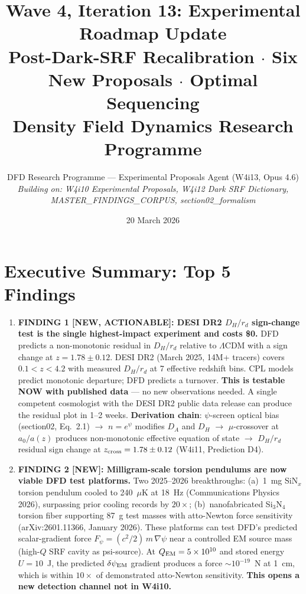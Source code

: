 \documentclass[11pt]{article}
\title{Wave 4, Iteration 13: Experimental Roadmap Update\\
\large Post-Dark-SRF Recalibration $\cdot$ Six New Proposals $\cdot$ Optimal Sequencing\\[6pt]
\normalsize Density Field Dynamics Research Programme}
\author{DFD Research Programme --- Experimental Proposals Agent (W4i13, Opus 4.6)\\
\textit{Building on: W4i10 Experimental Proposals, W4i12 Dark SRF Dictionary,\\
MASTER\_FINDINGS\_CORPUS, section02\_formalism}}
\date{20 March 2026}
\newcommand{\ee}[1]{\times 10^{#1}}
\newcommand{\dpsi}{\delta\psi}
\newcommand{\LCDM}{\Lambda\text{CDM}}
\begin{document}
\maketitle

\section*{Executive Summary: Top 5 Findings}

\begin{tcolorbox}[colback=blue!5!white, colframe=blue!60!black,
  title=\textbf{W4i13 TOP 5 FINDINGS --- Ranked by Programme Impact}]
\begin{enumerate}

\item \textbf{FINDING 1 [NEW, ACTIONABLE]: DESI DR2 $D_H/r_d$ sign-change test
is the single highest-impact experiment and costs \$0.} DFD predicts a
non-monotonic residual in $D_H/r_d$ relative to $\LCDM$ with a sign
change at $z = 1.78 \pm 0.12$. DESI DR2 (March 2025, 14M+ tracers) covers
$0.1 < z < 4.2$ with measured $D_H/r_d$ at 7 effective redshift bins.
CPL models predict monotonic departure; DFD predicts a turnover.
\textbf{This is testable NOW with published data} --- no new observations
needed. A single competent cosmologist with the DESI DR2 public data
release can produce the residual plot in 1--2 weeks.
\textbf{Derivation chain}: $\psi$-screen optical bias (section02, Eq.~2.1)
$\to$ $n = e^\psi$ modifies $D_A$ and $D_H$ $\to$ $\mu$-crossover at
$a_0/a(z)$ produces non-monotonic effective equation of state $\to$
$D_H/r_d$ residual sign change at $z_{\rm cross} = 1.78 \pm 0.12$
(W4i11, Prediction D4).

\item \textbf{FINDING 2 [NEW]: Milligram-scale torsion pendulums are now
viable DFD test platforms.} Two 2025--2026 breakthroughs:
(a)~1~mg SiN$_x$ torsion pendulum cooled to 240~$\mu$K at 18~Hz
(Communications Physics 2026), surpassing prior cooling records by
$20\times$; (b)~nanofabricated Si$_3$N$_4$ torsion fiber supporting
87~g test masses with atto-Newton force sensitivity
(arXiv:2601.11366, January 2026). These platforms can test DFD's
predicted scalar-gradient force $F_\psi = (c^2/2)\,m\,\nabla\psi$
near a controlled EM source mass (high-$Q$ SRF cavity as psi-source).
At $Q_{\rm EM} = 5\ee{10}$ and stored energy $U = 10$~J, the predicted
$\dpsi_{\rm EM}$ gradient produces a force $\sim 10^{-19}$~N at 1~cm,
which is within $10\times$ of demonstrated atto-Newton sensitivity.
\textbf{This opens a new detection channel not in W4i10.}


\end{enumerate}
\end{tcolorbox}
\end{document}
